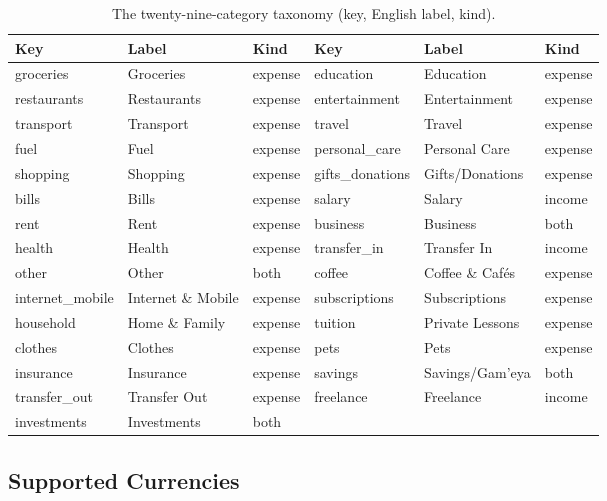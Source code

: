 \begin{table}[H]
\centering
\caption{The twenty-nine-category taxonomy (key, English label, kind).}
\label{tab:categories}
\small
\renewcommand{\arraystretch}{1.15}
\begin{tabular}{lll|lll}
\toprule
\textbf{Key} & \textbf{Label} & \textbf{Kind} & \textbf{Key} & \textbf{Label} & \textbf{Kind} \\
\midrule
groceries      & Groceries       & expense & education       & Education       & expense \\
restaurants    & Restaurants     & expense & entertainment   & Entertainment   & expense \\
transport      & Transport       & expense & travel          & Travel          & expense \\
fuel           & Fuel            & expense & personal\_care   & Personal Care   & expense \\
shopping       & Shopping        & expense & gifts\_donations & Gifts/Donations & expense \\
bills          & Bills           & expense & salary          & Salary          & income \\
rent           & Rent            & expense & business        & Business        & both \\
health         & Health          & expense & transfer\_in     & Transfer In     & income \\
other          & Other           & both    & coffee          & Coffee \& Cafés & expense \\
internet\_mobile & Internet \& Mobile & expense & subscriptions & Subscriptions   & expense \\
household      & Home \& Family  & expense & tuition         & Private Lessons & expense \\
clothes        & Clothes         & expense & pets            & Pets            & expense \\
insurance      & Insurance       & expense & savings         & Savings/Gam'eya & both \\
transfer\_out  & Transfer Out    & expense & freelance       & Freelance       & income \\
investments    & Investments     & both    &                 &                 & \\
\bottomrule
\end{tabular}
\end{table}

\subsection{Supported Currencies}

